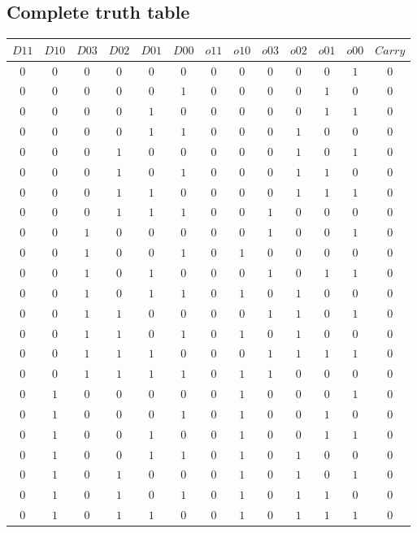 \documentclass [15pt,a4paper,twoside]{article}
\begin{document}
\subsection{Complete truth table}
\begin{center}
\begin{tabular}{cccccc|ccccccc}
$D11$&$D10$&$D03$&$D02$&$D01$&$D00$&$o11$&$o10$&$o03$&$o02$&$o01$&$o00$&$Carry$\\
\hline
$0$&$0$&$0$&$0$&$0$&$0$&$0$&$0$&$0$&$0$&$0$&$1$&$0$\\
$0$&$0$&$0$&$0$&$0$&$1$&$0$&$0$&$0$&$0$&$1$&$0$&$0$\\
$0$&$0$&$0$&$0$&$1$&$0$&$0$&$0$&$0$&$0$&$1$&$1$&$0$\\
$0$&$0$&$0$&$0$&$1$&$1$&$0$&$0$&$0$&$1$&$0$&$0$&$0$\\
$0$&$0$&$0$&$1$&$0$&$0$&$0$&$0$&$0$&$1$&$0$&$1$&$0$\\
$0$&$0$&$0$&$1$&$0$&$1$&$0$&$0$&$0$&$1$&$1$&$0$&$0$\\
$0$&$0$&$0$&$1$&$1$&$0$&$0$&$0$&$0$&$1$&$1$&$1$&$0$\\
$0$&$0$&$0$&$1$&$1$&$1$&$0$&$0$&$1$&$0$&$0$&$0$&$0$\\
$0$&$0$&$1$&$0$&$0$&$0$&$0$&$0$&$1$&$0$&$0$&$1$&$0$\\
$0$&$0$&$1$&$0$&$0$&$1$&$0$&$1$&$0$&$0$&$0$&$0$&$0$\\
$0$&$0$&$1$&$0$&$1$&$0$&$0$&$0$&$1$&$0$&$1$&$1$&$0$\\
$0$&$0$&$1$&$0$&$1$&$1$&$0$&$1$&$0$&$1$&$0$&$0$&$0$\\
$0$&$0$&$1$&$1$&$0$&$0$&$0$&$0$&$1$&$1$&$0$&$1$&$0$\\
$0$&$0$&$1$&$1$&$0$&$1$&$0$&$1$&$0$&$1$&$0$&$0$&$0$\\
$0$&$0$&$1$&$1$&$1$&$0$&$0$&$0$&$1$&$1$&$1$&$1$&$0$\\
$0$&$0$&$1$&$1$&$1$&$1$&$0$&$1$&$1$&$0$&$0$&$0$&$0$\\
$0$&$1$&$0$&$0$&$0$&$0$&$0$&$1$&$0$&$0$&$0$&$1$&$0$\\
$0$&$1$&$0$&$0$&$0$&$1$&$0$&$1$&$0$&$0$&$1$&$0$&$0$\\
$0$&$1$&$0$&$0$&$1$&$0$&$0$&$1$&$0$&$0$&$1$&$1$&$0$\\
$0$&$1$&$0$&$0$&$1$&$1$&$0$&$1$&$0$&$1$&$0$&$0$&$0$\\
$0$&$1$&$0$&$1$&$0$&$0$&$0$&$1$&$0$&$1$&$0$&$1$&$0$\\
$0$&$1$&$0$&$1$&$0$&$1$&$0$&$1$&$0$&$1$&$1$&$0$&$0$\\
$0$&$1$&$0$&$1$&$1$&$0$&$0$&$1$&$0$&$1$&$1$&$1$&$0$\\

\end{tabular}
\end{center}
\end{document}
